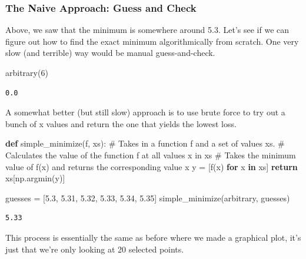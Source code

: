 \documentclass[
  letterpaper,
  DIV=11,
  numbers=noendperiod]{scrreprt}
\newenvironment{Shaded}{\begin{snugshade}}{\end{snugshade}}
\newcommand{\CommentTok}[1]{\textcolor[rgb]{0.37,0.37,0.37}{#1}}
\newcommand{\ControlFlowTok}[1]{\textcolor[rgb]{0.00,0.23,0.31}{\textbf{#1}}}
\newcommand{\DecValTok}[1]{\textcolor[rgb]{0.68,0.00,0.00}{#1}}
\newcommand{\FloatTok}[1]{\textcolor[rgb]{0.68,0.00,0.00}{#1}}
\newcommand{\KeywordTok}[1]{\textcolor[rgb]{0.00,0.23,0.31}{\textbf{#1}}}
\newcommand{\NormalTok}[1]{\textcolor[rgb]{0.00,0.23,0.31}{#1}}
\newcommand{\OperatorTok}[1]{\textcolor[rgb]{0.37,0.37,0.37}{#1}}
\begin{document}
\subsubsection{The Naive Approach: Guess and
Check}\label{the-naive-approach-guess-and-check}

Above, we saw that the minimum is somewhere around 5.3. Let's see if we
can figure out how to find the exact minimum algorithmically from
scratch. One very slow (and terrible) way would be manual
guess-and-check.

\begin{Shaded}
\begin{Highlighting}[]
\NormalTok{arbitrary(}\DecValTok{6}\NormalTok{)}
\end{Highlighting}
\end{Shaded}

\begin{verbatim}
0.0
\end{verbatim}

A somewhat better (but still slow) approach is to use brute force to try
out a bunch of x values and return the one that yields the lowest loss.

\begin{Shaded}
\begin{Highlighting}[]
\KeywordTok{def}\NormalTok{ simple\_minimize(f, xs):}
    \CommentTok{\# Takes in a function f and a set of values xs. }
    \CommentTok{\# Calculates the value of the function f at all values x in xs}
    \CommentTok{\# Takes the minimum value of f(x) and returns the corresponding value x }
\NormalTok{    y }\OperatorTok{=}\NormalTok{ [f(x) }\ControlFlowTok{for}\NormalTok{ x }\KeywordTok{in}\NormalTok{ xs]  }
    \ControlFlowTok{return}\NormalTok{ xs[np.argmin(y)]}

\NormalTok{guesses }\OperatorTok{=}\NormalTok{ [}\FloatTok{5.3}\NormalTok{, }\FloatTok{5.31}\NormalTok{, }\FloatTok{5.32}\NormalTok{, }\FloatTok{5.33}\NormalTok{, }\FloatTok{5.34}\NormalTok{, }\FloatTok{5.35}\NormalTok{]}
\NormalTok{simple\_minimize(arbitrary, guesses)}
\end{Highlighting}
\end{Shaded}

\begin{verbatim}
5.33
\end{verbatim}

This process is essentially the same as before where we made a graphical
plot, it's just that we're only looking at 20 selected points.
\end{document}
